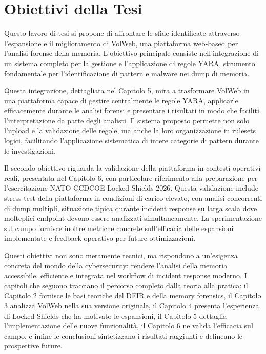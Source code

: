 \section{Obiettivi della Tesi}

Questo lavoro di tesi si propone di affrontare le sfide identificate attraverso l'espansione e il miglioramento di VolWeb, una piattaforma web-based per l'analisi forense della memoria. L'obiettivo principale consiste nell'integrazione di un sistema completo per la gestione e l'applicazione di regole YARA, strumento fondamentale per l'identificazione di pattern e malware nei dump di memoria. 

Questa integrazione, dettagliata nel Capitolo 5, mira a trasformare VolWeb in una piattaforma capace di gestire centralmente le regole YARA, applicarle efficacemente durante le analisi forensi e presentare i risultati in modo che faciliti l'interpretazione da parte degli analisti. Il sistema proposto permette non solo l'upload e la validazione delle regole, ma anche la loro organizzazione in rulesets logici, facilitando l'applicazione sistematica di intere categorie di pattern durante le investigazioni.

Il secondo obiettivo riguarda la validazione della piattaforma in contesti operativi reali, presentata nel Capitolo 6, con particolare riferimento alla preparazione per l'esercitazione NATO CCDCOE Locked Shields 2026. Questa validazione include stress test della piattaforma in condizioni di carico elevato, con analisi concorrenti di dump multipli, situazione tipica durante incident response su larga scala dove molteplici endpoint devono essere analizzati simultaneamente. La sperimentazione sul campo fornisce inoltre metriche concrete sull'efficacia delle espansioni implementate e feedback operativo per future ottimizzazioni.

Questi obiettivi non sono meramente tecnici, ma rispondono a un'esigenza concreta del mondo della cybersecurity: rendere l'analisi della memoria accessibile, efficiente e integrata nel workflow di incident response moderno. I capitoli che seguono tracciano il percorso completo dalla teoria alla pratica: il Capitolo 2 fornisce le basi teoriche del DFIR e della memory forensics, il Capitolo 3 analizza VolWeb nella sua versione originale, il Capitolo 4 presenta l'esperienza di Locked Shields che ha motivato le espansioni, il Capitolo 5 dettaglia l'implementazione delle nuove funzionalità, il Capitolo 6 ne valida l'efficacia sul campo, e infine le conclusioni sintetizzano i risultati raggiunti e delineano le prospettive future.